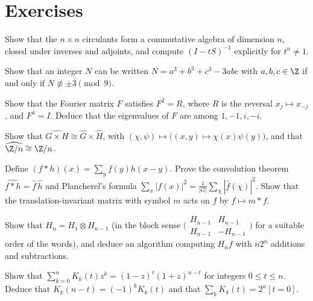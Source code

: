 \section{Exercises}

\begin{exercise}[$\star$]\label{ex:circalg}
Show that the $n\times n$ circulants form a commutative algebra of dimension $n$, closed under inverses and adjoints, and
compute $(I-tS)^{-1}$ explicitly for $t^n\ne1$.
\end{exercise}

\begin{exercise}[$\star\star$]\label{ex:circ3}
Show that an integer $N$ can be written $N=a^3+b^3+c^3-3abc$ with $a,b,c\in\Z$ if and only if $N\not\equiv\pm3\pmod9$.
\end{exercise}

\begin{exercise}[$\star$]\label{ex:fourier}
Show that the Fourier matrix $F$ satisfies $F^2=R$, where $R$ is the reversal $x_j\mapsto x_{-j}$, and $F^4=I$. Deduce that the
eigenvalues of $F$ are among $1,-1,i,-i$.
\end{exercise}

\begin{exercise}[$\star$]\label{ex:dualgroup}
Show that $\widehat{G\times H}\cong\widehat G\times\widehat H$, with $(\chi,\psi)\mapsto\bigl((x,y)\mapsto\chi(x)\psi(y)\bigr)$, and that
$\widehat{\Z/n}\cong\Z/n$.
\end{exercise}

\begin{exercise}[$\star\star$]\label{ex:convolution}
Define $(f*h)(x)=\sum_yf(y)h(x-y)$. Prove the convolution theorem $\widehat{f*h}=\hat f\,\hat h$ and Plancherel's formula
$\sum_x|f(x)|^2=\frac1{|G|}\sum_\chi|\hat f(\chi)|^2$. Show that the translation-invariant matrix with symbol $m$ acts on $f$ by
$f\mapsto m*f$.
\end{exercise}

\begin{exercise}[$\star\star$]\label{ex:walsh}
Show that $H_n=H_1\otimes H_{n-1}$ (in the block sense $\bigl(\begin{smallmatrix}H_{n-1}&H_{n-1}\\H_{n-1}&-H_{n-1}\end{smallmatrix}\bigr)$
for a suitable order of the words), and deduce an algorithm computing $H_nf$ with $n2^n$ additions and subtractions.
\end{exercise}

\begin{exercise}[$\star$]\label{ex:krawgen}
Show that $\sum_{k=0}^nK_k(t)z^k=(1-z)^t(1+z)^{n-t}$ for integers $0\le t\le n$. Deduce that $K_k(n-t)=(-1)^kK_k(t)$ and that
$\sum_kK_k(t)=2^n[t=0]$.
\end{exercise}

